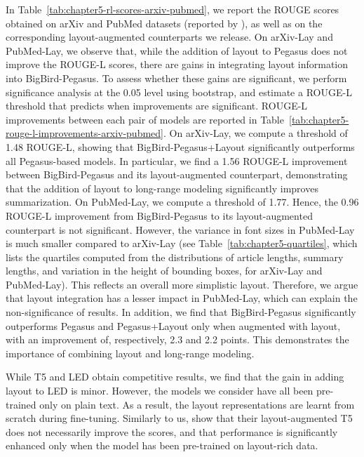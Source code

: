 In Table~\ref{tab:chapter5-rl-scores-arxiv-pubmed}, we report the ROUGE scores obtained on arXiv and PubMed datasets (reported by \citet{zaheer2020big}), as well as on the corresponding layout-augmented counterparts we release. On arXiv-Lay and PubMed-Lay, we observe that, while the addition of layout to Pegasus does not improve the ROUGE-L scores, there are gains in integrating layout information into BigBird-Pegasus. To assess whether these gains are significant, we perform significance analysis at the 0.05 level using bootstrap, and estimate a ROUGE-L threshold that predicts when improvements are significant. ROUGE-L improvements between each pair of models are reported in Table~\ref{tab:chapter5-rouge-l-improvements-arxiv-pubmed}. On arXiv-Lay, we compute a threshold of 1.48 ROUGE-L, showing that BigBird-Pegasus+Layout significantly outperforms all Pegasus-based models. In particular, we find a 1.56 ROUGE-L improvement between BigBird-Pegasus and its layout-augmented counterpart, demonstrating that the addition of layout to long-range modeling significantly improves summarization. On PubMed-Lay, we compute a threshold of 1.77. Hence, the 0.96 ROUGE-L improvement from BigBird-Pegasus to its layout-augmented counterpart is not significant. However, the variance in font sizes in PubMed-Lay is much smaller compared to arXiv-Lay (see Table~\ref{tab:chapter5-quartiles}, which lists the quartiles computed from the distributions of article lengths, summary lengths, and variation in the height of bounding boxes, for arXiv-Lay and PubMed-Lay). This reflects an overall more simplistic layout. Therefore, we argue that layout integration has a lesser impact in PubMed-Lay, which can explain the non-significance of results. In addition, we find that BigBird-Pegasus significantly outperforms Pegasus and Pegasus+Layout only when augmented with layout, with an improvement of, respectively, 2.3 and 2.2 points. This demonstrates the importance of combining layout and long-range modeling. 

While T5 and LED obtain competitive results, we find that the gain in adding layout to LED is minor. However, the models we consider have all been pre-trained only on plain text. As a result, the layout representations are learnt from scratch during fine-tuning. Similarly to us, \citet{borchmann2021due} show that their layout-augmented T5 does not necessarily improve the scores, and that performance is significantly enhanced only when the model has been pre-trained on layout-rich data.  

